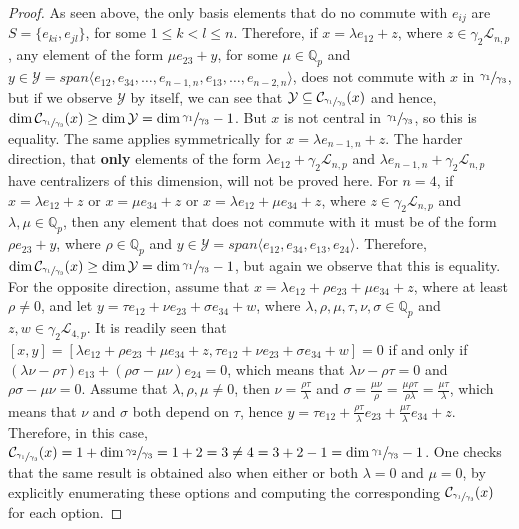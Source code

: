 \documentclass[12pt]{article}
\begin{document}
\begin{proof}
As seen above, the only basis elements that do no commute with $e_{ij}$ are $S=\{e_{ki},e_{jl}\}$, for some $1\leq k<l\leq n$. Therefore, if $x=\lambda e_{12}+z$, where $z\in\gamma_2\mathcal{L}_{n,p}$, any element of the form $\mu e_{23}+y$, for some $\mu\in\mathbb{Q}_p$ and $y\in\mathcal{Y}=span\langle e_{12},e_{34},\dots,e_{n-1,n},e_{13},\dots,e_{n-2,n}\rangle$, does not commute with $x$ in $\sfrac{\gamma_1}{\gamma_3}$, but if we observe $\mathcal{Y}$ by itself, we can see that $\mathcal{Y}\subseteq\mathcal{C}_{\sfrac{\gamma_1}{\gamma_3}}(x)$ and hence, $\dim\mathcal{C}_{\sfrac{\gamma_1}{\gamma_3}}(x)\geq\dim\mathcal{Y}=\dim\sfrac{\gamma_1}{\gamma_3}-1$. But $x$ is not central in $\sfrac{\gamma_1}{\gamma_3}$, so this is equality. The same applies symmetrically for $x=\lambda e_{n-1,n}+z$. The harder direction, that \textbf{only} elements of the form $\lambda e_{12}+\gamma_2\mathcal{L}_{n,p}$ and $\lambda e_{n-1,n}+\gamma_2\mathcal{L}_{n,p}$ have centralizers of this dimension, will not be proved here. For $n=4$, if $x=\lambda e_{12}+z$ or $x=\mu e_{34}+z$ or $x=\lambda e_{12}+\mu e_{34}+z$, where $z\in\gamma_2\mathcal{L}_{n,p}$ and $\lambda,\mu\in\mathbb{Q}_p$, then any element that does not commute with it must be of the form $\rho e_{23}+y$, where $\rho\in\mathbb{Q}_p$ and $y\in\mathcal{Y}=span\langle e_{12},e_{34},e_{13},e_{24}\rangle$. Therefore, $\dim\mathcal{C}_{\sfrac{\gamma_1}{\gamma_3}}(x)\geq\dim\mathcal{Y}=\dim\sfrac{\gamma_1}{\gamma_3}-1$, but again we observe that this is equality. For the opposite direction, assume that $x=\lambda e_{12}+\rho e_{23}+\mu e_{34}+z$, where at least $\rho\neq 0$, and let $y=\tau e_{12}+\nu e_{23}+\sigma e_{34}+w$, where $\lambda,\rho,\mu,\tau,\nu,\sigma\in\mathbb{Q}_p$ and $z,w\in\gamma_2\mathcal{L}_{4,p}$. It is readily seen that $[x,y]=[\lambda e_{12}+\rho e_{23}+\mu e_{34}+z,\tau e_{12}+\nu e_{23}+\sigma e_{34}+w]=0$ if and only if $(\lambda\nu-\rho\tau)e_{13}+(\rho\sigma-\mu\nu)e_{24}=0$, which means that $\lambda\nu-\rho\tau=0$ and $\rho\sigma-\mu\nu=0$. Assume that $\lambda,\rho,\mu\neq 0$, then $\nu=\frac{\rho\tau}{\lambda}$ and $\sigma=\frac{\mu\nu}{\rho}=\frac{\mu\rho\tau}{\rho\lambda}=\frac{\mu\tau}{\lambda}$, which means that $\nu$ and $\sigma$ both depend on $\tau$, hence $y=\tau e_{12}+\frac{\rho\tau}{\lambda}e_{23}+\frac{\mu\tau}{\lambda}e_{34}+z$. Therefore, in this case, $\mathcal{C}_{\sfrac{\gamma_1}{\gamma_3}}(x)=1+\dim\sfrac{\gamma_2}{\gamma_3}=1+2=3\neq 4=3+2-1=\dim\sfrac{\gamma_1}{\gamma_3}-1$. One checks that the same result is obtained also when either or both $\lambda=0$ and $\mu=0$, by explicitly enumerating these options and computing the corresponding $\mathcal{C}_{\sfrac{\gamma_1}{\gamma_3}}(x)$ for each option. 
\end{proof}
\end{document}
